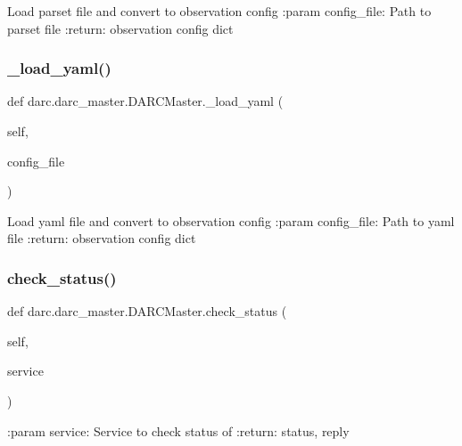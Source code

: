 \begin{DoxyVerb}Load parset file and convert to observation config
:param config_file: Path to parset file
:return: observation config dict
\end{DoxyVerb}
 \mbox{\label{classdarc_1_1darc__master_1_1_d_a_r_c_master_a168d2c658d0d916f2d9a8db6c573fec5}} 
\subsubsection{\texorpdfstring{\_load\_yaml()}{\_load\_yaml()}}
{\footnotesize\ttfamily def darc.\+darc\+\_\+master.\+D\+A\+R\+C\+Master.\+\_\+load\+\_\+yaml (\begin{DoxyParamCaption}\item[{}]{self,  }\item[{}]{config\+\_\+file }\end{DoxyParamCaption})\hspace{0.3cm}{\ttfamily [private]}}

\begin{DoxyVerb}Load yaml file and convert to observation config
:param config_file: Path to yaml file
:return: observation config dict
\end{DoxyVerb}
 \mbox{\label{classdarc_1_1darc__master_1_1_d_a_r_c_master_a771d938b3a1a5d1f9c2e38c7d3041fee}} 
\subsubsection{\texorpdfstring{check\_status()}{check\_status()}}
{\footnotesize\ttfamily def darc.\+darc\+\_\+master.\+D\+A\+R\+C\+Master.\+check\+\_\+status (\begin{DoxyParamCaption}\item[{}]{self,  }\item[{}]{service }\end{DoxyParamCaption})}

\begin{DoxyVerb}:param service: Service to check status of
:return: status, reply
\end{DoxyVerb}
 \mbox{\label{classdarc_1_1darc__master_1_1_d_a_r_c_master_abe8e4b875cbac792c18bb4bb2088ca8c}} 
